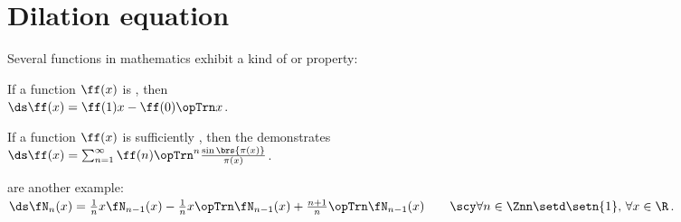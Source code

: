 
\section{Dilation equation}
Several functions in mathematics exhibit a kind of  or  property:
\begin{listi}
  \item If a function $\ff(x)$ is , then 
        \\\indentx$\ds\ff(x) = \ff(1)x - \ff(0)\opTrn x$.   %
  \item If a function $\ff(x)$ is sufficiently , then the   demonstrates
        \\\indentx$\ds\ff(x) = \sum_{n=1}^\infty \ff(n) \opTrn^n\frac{\sin\brs{\pi(x)}}{\pi(x)}$.
  \item {} are another example:
        \\\indentx$\ds\fN_n(x)   = \frac{1}{n}x\fN_{n-1}(x) - \frac{1}{n}x\opTrn\fN_{n-1}(x) + \frac{n+1}{n}\opTrn\fN_{n-1}(x)  \qquad\scy\forall n\in\Znn\setd\setn{1},\,  \forall x\in\R$.
\end{listi}

